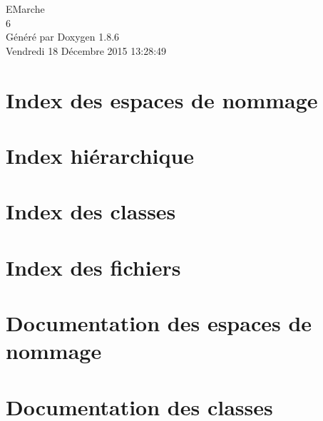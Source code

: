 \documentclass[twoside]{book}
\newcommand{\clearemptydoublepage}{%
  \newpage{\pagestyle{empty}\cleardoublepage}%
}
\begin{document}
\hypersetup{pageanchor=false}
\begin{titlepage}
\vspace*{7cm}
\begin{center}%
{\Large E\-Marche \\[1ex]\large 6 }\\
\vspace*{1cm}
{\large Généré par Doxygen 1.8.6}\\
\vspace*{0.5cm}
{\small Vendredi 18 Décembre 2015 13:28:49}\\
\end{center}
\end{titlepage}
\clearemptydoublepage
\tableofcontents
\clearemptydoublepage
{}
\hypersetup{pageanchor=true}

\chapter{Index des espaces de nommage}

\chapter{Index hiérarchique}

\chapter{Index des classes}

\chapter{Index des fichiers}

\chapter{Documentation des espaces de nommage}

\chapter{Documentation des classes}





















\end{document}
